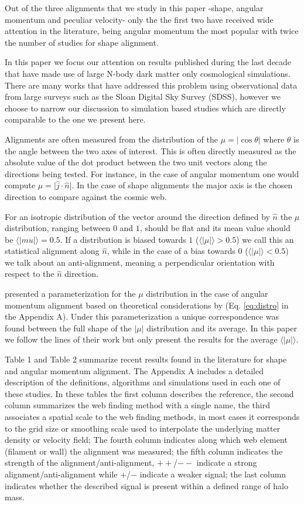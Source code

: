 \documentclass[useAMS,usenatbib]{mn2e}
\begin{document}
Out of the three alignments that we study in this paper -shape,
angular momentum and peculiar velocity- only the the first two have
received wide attention in the literature, being angular momentum the
most popular with twice the number of studies for shape alignment.

In this paper we focus our attention on results published during the last
decade that have made use of large N-body dark matter only
cosmological simulations. There are many works that have addressed
this problem using observational data from large surveys such as the
Sloan Digital Sky Survey (SDSS), however we choose to narrow our
discussion to simulation based studies which are
directly comparable to the one we present here.

Alignments are often measured from the distribution of the
$\mu=\vert\cos\theta\vert$ where $\theta$ is the angle between the two axes of
interest. This is often directly measured as the absolute value of
the dot product between the two unit vectors along the directions
being tested. For instance, in the case of angular momentum one would compute
$\mu=\vert\hat{j}\cdot\hat{n}\vert$. In the case of shape alignments the major
axis is the chosen direction to compare against the cosmic web.

For an isotropic distribution of the vector around the direction defined by
$\hat{n}$ the $\mu$ distribution, ranging between $0$ and $1$, should
be flat and its mean value should be
$\langle|mu|\rangle=0.5$. If a distribution is biased towards $1$
($\langle\vert\mu\vert\rangle>0.5$) we call this an statistical
alignment along $\hat{n}$, while in the case of a bias towards $0$
($\langle\vert\mu\vert\rangle<0.5$) we talk about an anti-alignment,
meaning a perpendicular orientation with respect to the $\hat{n}$
direction.

\cite{Trowland2013} presented a parameterization for the $\mu$
distribution in the case of angular momentum alignment based on
theoretical considerations by \cite{Lee2005} (Eq. \ref{eq:distro} in
the Appendix A). Under this parameterization a unique
correspondence was found between the full shape of the $\vert\mu\vert$
distribution and its average. In this paper we follow the lines of their work but
only present the results for the average $\langle\vert\mu\vert\rangle$.

Table 1 and Table 2 summarize recent results found in the literature for
shape and angular momentum alignment. The Appendix A includes a detailed
description of the definitions, algorithms and simulations used in
each one of these studies. In these tables the first column describes
the reference, the second column summarizes the web finding method
with a single name, the third associates a spatial scale to the
web finding methods, in most cases it corresponds to the grid size or
smoothing scale used to interpolate the underlying matter density or
velocity field; The fourth column indicates along which web element
(filament or wall) the alignment was measured; the fifth column
indicates the strength of the alignment/anti-alignment, $++$/$--$
indicate a strong alignment/anti-alignment while $+$/$-$ indicate a
weaker signal; the last column indicates whether the described signal
is present within a defined range of halo mass.
\end{document}
